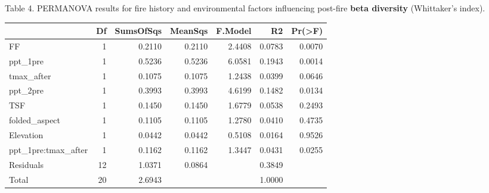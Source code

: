 \documentclass[8pt,]{article}
\begin{document}
\clearpage
\newpage

Table 4. PERMANOVA results for fire history and environmental factors
influencing post-fire \textbf{beta diversity} (Whittaker's index).

\begin{longtable}[]{@{}lrrrrrr@{}}
\toprule
& Df & SumsOfSqs & MeanSqs & F.Model & R2 &
Pr(\textgreater{}F)\tabularnewline
\midrule
\endhead
FF & 1 & 0.2110 & 0.2110 & 2.4408 & 0.0783 & 0.0070\tabularnewline
ppt\_1pre & 1 & 0.5236 & 0.5236 & 6.0581 & 0.1943 &
0.0014\tabularnewline
tmax\_after & 1 & 0.1075 & 0.1075 & 1.2438 & 0.0399 &
0.0646\tabularnewline
ppt\_2pre & 1 & 0.3993 & 0.3993 & 4.6199 & 0.1482 &
0.0134\tabularnewline
TSF & 1 & 0.1450 & 0.1450 & 1.6779 & 0.0538 & 0.2493\tabularnewline
folded\_aspect & 1 & 0.1105 & 0.1105 & 1.2780 & 0.0410 &
0.4735\tabularnewline
Elevation & 1 & 0.0442 & 0.0442 & 0.5108 & 0.0164 &
0.9526\tabularnewline
ppt\_1pre:tmax\_after & 1 & 0.1162 & 0.1162 & 1.3447 & 0.0431 &
0.0255\tabularnewline
Residuals & 12 & 1.0371 & 0.0864 & & 0.3849 &\tabularnewline
Total & 20 & 2.6943 & & & 1.0000 &\tabularnewline
\bottomrule
\end{longtable}
\end{document}
